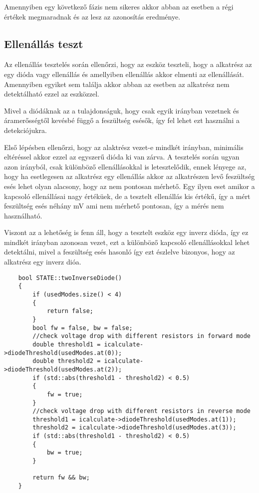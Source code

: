 Amennyiben egy következő fázis nem sikeres akkor abban az esetben 
a régi értékek megmaradnak és az lesz az azonosítás eredménye.

\subsection{Ellenállás teszt}

Az ellenállás tesztelés során ellenőrzi, hogy az eszköz teszteli, 
hogy a alkatrész az egy dióda vagy ellenállás és amellyiben ellenállás 
akkor elmenti az ellenállását. Amennyiben egyiket sem találja
akkor abban az esetben az alkatrész nem detektálható ezzel az eszközzel.

Mivel a diódáknak az a tulajdonságuk, hogy csak egyik irányban vezetnek
és áramerősségtől kevésbé függő a feszültség esésők, így fel lehet ezt
használni a detekciójukra.

Első lépésben ellenőrzi, hogy az alaktrész vezet-e mindkét irányban, 
minimális eltéréssel akkor ezzel az egyszerű dióda ki van zárva.
A tesztelés során ugyan azon irányból, csak különböző ellenállásokkal
is letesztelődik, ennek lényege az, hogy ha esetlegesen az alkatrész
egy ellenállás akkor az alkatrészen levő feszültség esés lehet olyan alacsony,
hogy az nem pontosan mérhető. 
Egy ilyen eset amikor a kapcsoló ellenállásai nagy értéküek, de a tesztelt 
ellenállás kis értékű, így
a mért feszültség esés néhány mV ami nem mérhető pontosan, így a 
mérés nem használható. 

Viszont az a lehetőség is fenn áll, hogy a tesztelt eszköz egy
inverz dióda, így ez mindkét irányban azonosan vezet, ezt a különböző
kapcsoló ellenállásokkal lehet detektálni, mivel a feszültség esés hasonló
így ezt észlelve bizonyos, hogy az alkatrész egy inverz dióa.

\begin{lstlisting}
    bool STATE::twoInverseDiode()
    {
        if (usedModes.size() < 4)
        {
            return false;
        }
        bool fw = false, bw = false;
        //check voltage drop with different resistors in forward mode
        double threshold1 = icalculate->diodeThreshold(usedModes.at(0));
        double threshold2 = icalculate->diodeThreshold(usedModes.at(2));
        if (std::abs(threshold1 - threshold2) < 0.5)
        {
            fw = true;
        }
        //check voltage drop with different resistors in reverse mode
        threshold1 = icalculate->diodeThreshold(usedModes.at(1));
        threshold2 = icalculate->diodeThreshold(usedModes.at(3));
        if (std::abs(threshold1 - threshold2) < 0.5)
        {
            bw = true;
        }
        
        return fw && bw;
    }
\end{lstlisting}


